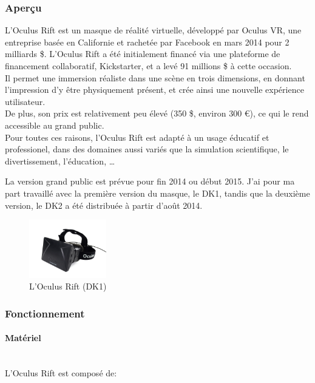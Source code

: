 \documentclass[a4paper,french,12pt]{article}
\begin{document}
		\subsubsection{Aperçu}
		  L'Oculus Rift est un masque de réalité virtuelle, développé par Oculus VR, une entreprise 
		  basée en Californie et rachetée par Facebook en mars 2014 pour  2 milliards \$.
		  L'Oculus Rift a été initialement financé via une plateforme de financement collaboratif, Kickstarter,
		  et a levé 91 millions \$ à cette occasion. \\
		  Il permet une immersion  réaliste dans une scène en trois dimensions, en donnant l'impression d'y être physiquement
		  présent, et crée ainsi une nouvelle expérience
		  utilisateur. \\
		  De plus, son prix est relativement peu élevé (350 \$, environ 300 \euro), ce qui le rend accessible au grand public. \\
		  Pour toutes ces raisons, l'Oculus Rift est adapté à un usage éducatif et professionel, dans des domaines aussi variés
		  que la simulation scientifique, le divertissement, l'éducation, \ldots
		  
		  La version grand public est prévue pour fin 2014 ou début 2015. J'ai pour ma part travaillé avec la première
		  version du masque, le DK1, tandis que la deuxième version, le DK2 a été distribuée à partir d'août 2014.
		  
		  \begin{figure}[h!]
		    \centering
		      \includegraphics[width=0.3\textwidth]{dk1.jpg}
		    \caption{L'Oculus Rift (DK1)}
		  \end{figure}
		  
		  \subsubsection{Fonctionnement}
		  
			\paragraph{Matériel} ~\\
		    
				L'Oculus Rift est composé de:\\
			      
\end{document}
